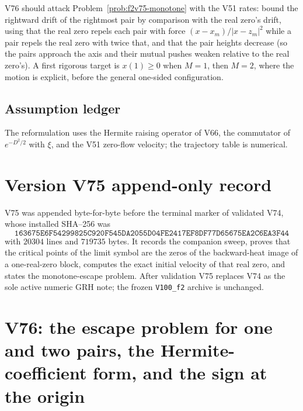\documentclass[11pt]{article}
\theoremstyle{definition}
\theoremstyle{remark}
\begin{document}
V76 should attack Problem~\ref{prob:f2v75-monotone} with the V51 rates:
bound the rightward drift of the rightmost pair by comparison with the
real zero's drift, using that the real zero repels each pair with force
\((x-x_m)/|x-z_m|^2\) while a pair repels the real zero with twice that,
and that the pair heights decrease (so the pairs approach the axis and
their mutual pushes weaken relative to the real zero's).  A first
rigorous target is \(x(1)\ge0\) when \(M=1\), then \(M=2\), where the
motion is explicit, before the general one-sided configuration.

\subsection*{Assumption ledger}
\label{ass:f2v75}
The reformulation uses the Hermite raising operator of V66, the
commutator of \(e^{-D^2/2}\) with \(\xi\), and the V51 zero-flow
velocity; the trajectory table is numerical.
\endgroup

\section*{Version V75 append-only record}

V75 was appended byte-for-byte before the terminal marker of validated
V74, whose installed SHA--256 was
\[
 \texttt{163675E6F54299825C920F545DA2055D}
 \allowbreak\texttt{04FE2417EF8DF77D65675EA2C6EA3F44}
\]
with \(20304\) lines and \(719735\) bytes.  It records the companion
sweep, proves that the critical points of the limit symbol are the zeros
of the backward-heat image of a one-real-zero block, computes the exact
initial velocity of that real zero, and states the monotone-escape
problem.  After validation V75 replaces V74 as the sole active numeric
GRH note; the frozen \texttt{V100\_f2} archive is unchanged.





\clearpage
\section{V76: the escape problem for one and two pairs, the Hermite-coefficient form, and the sign at the origin}
\label{sec:f2v76-escape}
\begingroup
\setcounter{equation}{0}
\renewcommand{\theequation}{N76.\arabic{equation}}
\renewcommand{\theHequation}{f2v76.\arabic{equation}}
\end{document}

